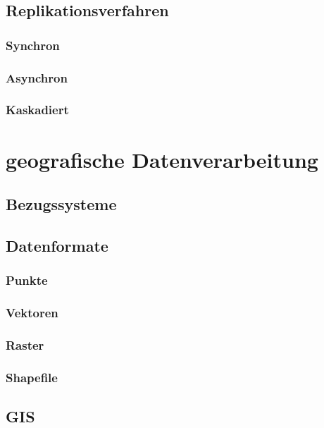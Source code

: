 \subsection{Replikationsverfahren}

\subsubsection{Synchron}

\subsubsection{Asynchron}

\subsubsection{Kaskadiert}

\newpage

\section{geografische Datenverarbeitung}

\subsection{Bezugssysteme}

\subsection{Datenformate}

\subsubsection{Punkte}

\subsubsection{Vektoren}

\subsubsection{Raster}

\subsubsection{Shapefile}

\subsection{GIS}

